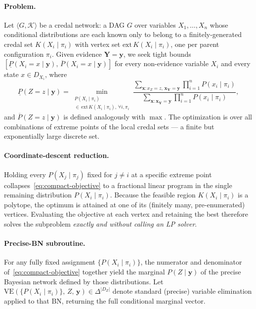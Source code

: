 \documentclass[11pt]{article}
\begin{document}
\paragraph{Problem.}
Let $\langle G, \mathcal{K} \rangle$ be a credal network: a DAG $G$ over
variables $X_1, \ldots, X_n$ whose conditional distributions are each known
only to belong to a finitely-generated credal set $K(X_i \mid \pi_i)$ with
vertex set $\mathrm{ext}\,K(X_i \mid \pi_i)$, one per parent configuration
$\pi_i$. Given evidence $\mathbf{Y} = \mathbf{y}$, we seek tight bounds
$[\underline{P}(X_i{=}x \mid \mathbf{y}),\, \overline{P}(X_i{=}x \mid \mathbf{y})]$
for every non-evidence variable $X_i$ and every state $x \in D_{X_i}$, where
\begin{equation}\label{eq:compact-objective}
  \underline{P}(Z{=}z \mid \mathbf{y}) =
  \min_{\substack{P(X_i \mid \pi_i) \\ \in\, \mathrm{ext}\,K(X_i \mid \pi_i),\, \forall i, \pi_i}}
  \frac{\sum_{\mathbf{x} : x_Z = z,\, \mathbf{x}_\mathbf{Y} = \mathbf{y}}
        \prod_{i=1}^{n} P(x_i \mid \pi_i)}
       {\sum_{\mathbf{x} : \mathbf{x}_\mathbf{Y} = \mathbf{y}}
        \prod_{i=1}^{n} P(x_i \mid \pi_i)},
\end{equation}
and $\overline{P}(Z{=}z \mid \mathbf{y})$ is defined analogously with $\max$.
The optimization is over all combinations of extreme points of the local
credal sets --- a finite but exponentially large discrete set.

\paragraph{Coordinate-descent reduction.}
Holding every $P(X_j \mid \pi_j)$ fixed for $j \neq i$ at a specific extreme
point collapses~\eqref{eq:compact-objective} to a fractional linear program in
the single remaining distribution $P(X_i \mid \pi_i)$. Because the feasible
region $K(X_i \mid \pi_i)$ is a polytope, the optimum is attained at one of
its (finitely many, pre-enumerated) vertices. Evaluating the objective at
each vertex and retaining the best therefore solves the subproblem
\emph{exactly and without calling an LP solver}.

\paragraph{Precise-BN subroutine.}
For any fully fixed assignment $\{P(X_i \mid \pi_i)\}$, the numerator and
denominator of~\eqref{eq:compact-objective} together yield the marginal
$P(Z \mid \mathbf{y})$ of the precise Bayesian network defined by those
distributions. Let $\mathrm{VE}(\{P(X_i \mid \pi_i)\},\, Z,\, \mathbf{y})
\in \Delta^{|D_Z|}$ denote standard (precise) variable elimination applied
to that BN, returning the full conditional marginal vector.
\end{document}

